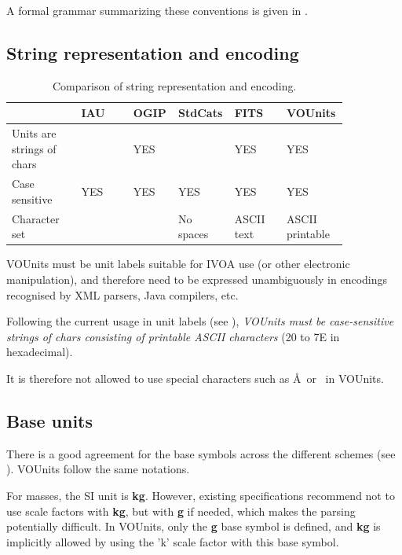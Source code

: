 \documentclass[12pt,notitlepage,onecolumn]{ivoa}
\newcommand{\unit}[1]{\textbf{\textsf{\color{orange}#1}}}
\def\micro{{\symbo \char109}}
\begin{document}
A formal grammar summarizing these conventions is given in .

\subsection{String representation and encoding\label{sec:encoding}}

\begin{table}
  \begin{tabular}{|p{0.2\linewidth}|p{0.15\linewidth}|p{0.1\linewidth}|p{0.1\linewidth}|p{0.15\linewidth}|p{0.15\linewidth}|}
\hline
    & IAU & OGIP  & StdCats & FITS  & VOUnits\\\hline
    Units are strings of chars &  & YES &  & YES & YES\\\hline
    Case sensitive & YES & YES & YES & YES & YES\\\hline
    Character set &  &  & No spaces & ASCII text & ASCII printable\\\hline
\end{tabular}
  \caption{Comparison of string representation and encoding.}
  \label{tab:comparUnitEncoding}
\end{table}

VOUnits must be unit labels suitable for IVOA use (or other electronic manipulation),
and therefore need to be expressed unambiguously in encodings recognised by XML parsers,
Java compilers, etc.  

Following the current usage in unit labels (see ), \emph{VOUnits must be 
case-sensitive strings of chars consisting of printable ASCII characters} (20 to 7E in hexadecimal).

It is therefore not allowed to use special characters such as \AA\ or \micro\ in VOUnits.

\subsection{Base units\label{sec:baseUnits}}

There is a good agreement for the base symbols across the different schemes (see ).
VOUnits follow the same notations.

For masses, the SI unit is \unit{kg}. However, existing specifications recommend not to use scale factors with
\unit{kg}, but with \unit{g} if needed, which makes the parsing potentially difficult. In VOUnits, only the 
\unit{g} base symbol is defined, and \unit{kg} is implicitly allowed by using the 'k' scale factor with this
base symbol. 
\end{document}
